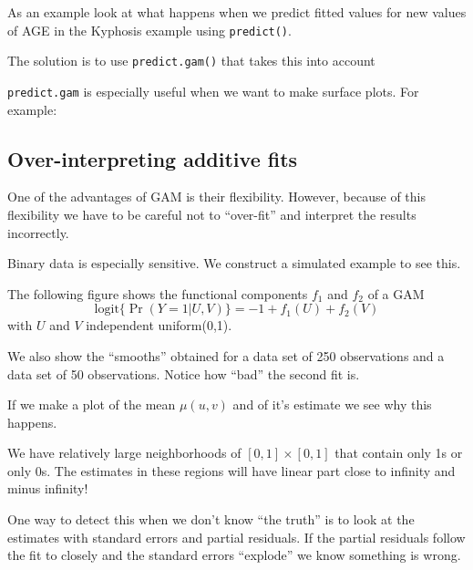 As an example look at what happens when we predict fitted values
for new values of AGE in the Kyphosis example using {\tt predict()}.

The solution is to use {\tt predict.gam()} that takes this into account 

\centerline{}


{\tt predict.gam} is especially useful when we want to make surface
plots. For example:

\centerline{}

\newpage


\subsection{Over-interpreting additive fits}
One of the advantages of GAM is their flexibility. However, because of
this flexibility we have to be careful  not to ``over-fit'' and interpret
the results incorrectly. 

Binary data is especially sensitive. We construct a simulated example
to see this.

The following figure shows the functional components $f_1$ and $f_2$
of a GAM 
\[
\mbox{logit}\{\Pr(Y=1|U,V)\} = -1 + f_1(U) + f_2(V)
\] 
with $U$ and $V$ independent uniform(0,1).

\centerline{}

We also show the ``smooths'' obtained for a data set of 250
observations and a data set of 50 observations. Notice how ``bad'' the
second fit is. 

If we make a plot of the mean $\mu(u,v)$ and of it's estimate we see
why this happens.

\centerline{}

We have relatively large neighborhoods of $[0,1] \times [0,1]$ that
contain only 1s or only 0s. The estimates in these regions will have
linear part close to infinity and minus infinity! 

One way to detect this when we don't know ``the truth'' is to look at
the estimates with standard errors and partial residuals. If the
partial residuals follow the fit to closely and the standard errors
``explode'' we know something is wrong.

\centerline{}

\newpage
